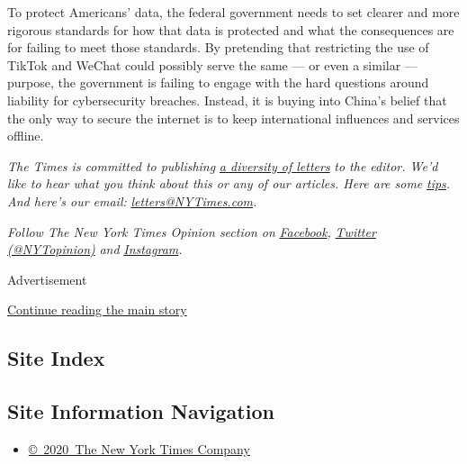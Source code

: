 To protect Americans' data, the federal government needs to set clearer
and more rigorous standards for how that data is protected and what the
consequences are for failing to meet those standards. By pretending that
restricting the use of TikTok and WeChat could possibly serve the same
--- or even a similar --- purpose, the government is failing to engage
with the hard questions around liability for cybersecurity breaches.
Instead, it is buying into China's belief that the only way to secure
the internet is to keep international influences and services offline.

\emph{The Times is committed to publishing}
\href{https://www.nytimes3xbfgragh.onion/2019/01/31/opinion/letters/letters-to-editor-new-york-times-women.html}{\emph{a
diversity of letters}} \emph{to the editor. We'd like to hear what you
think about this or any of our articles. Here are some}
\href{https://help.nytimes3xbfgragh.onion/hc/en-us/articles/115014925288-How-to-submit-a-letter-to-the-editor}{\emph{tips}}\emph{.
And here's our email:}
\href{mailto:letters@NYTimes.com}{\emph{letters@NYTimes.com}}\emph{.}

\emph{Follow The New York Times Opinion section on}
\href{https://www.facebookcorewwwi.onion/nytopinion}{\emph{Facebook}}\emph{,}
\href{http://twitter.com/NYTOpinion}{\emph{Twitter (@NYTopinion)}}
\emph{and}
\href{https://www.instagram.com/nytopinion/}{\emph{Instagram}}\emph{.}

Advertisement

\protect\hyperlink{after-bottom}{Continue reading the main story}

\hypertarget{site-index}{%
\subsection{Site Index}\label{site-index}}

\hypertarget{site-information-navigation}{%
\subsection{Site Information
Navigation}\label{site-information-navigation}}

\begin{itemize}
\tightlist
\item
  \href{https://help.nytimes3xbfgragh.onion/hc/en-us/articles/115014792127-Copyright-notice}{©~2020~The
  New York Times Company}
\end{itemize}

